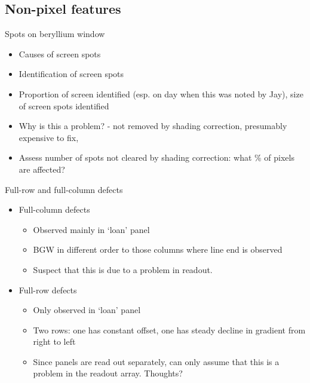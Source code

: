 \documentclass{beamer}
\begin{document}

\subsection{Non-pixel features}

\begin{frame}{Spots on beryllium window}

	\begin{itemize}
	
		\item Causes of screen spots
		
		\item Identification of screen spots
		
		\item Proportion of screen identified (esp. on day when this was noted by Jay), size of screen spots identified
		
		\item Why is this a problem? - not removed by shading correction, presumably expensive to fix, 
		
		\item Assess number of spots not cleared by shading correction: what \% of pixels are affected?
	
	\end{itemize}
	
\end{frame}


\begin{frame}{Full-row and full-column defects}

	\begin{itemize}
		\item Full-column defects
		\begin{itemize}
			\item Observed mainly in `loan' panel
			\item BGW in different order to those columns where line end is observed
			\item Suspect that this is due to a problem in readout.
		\end{itemize}
		\item Full-row defects
		\begin{itemize}
			\item Only observed in `loan' panel
			\item Two rows: one has constant offset, one has steady decline in gradient from right to left
			\item Since panels are read out separately, can only assume that this is a problem in the readout array. Thoughts?
		\end{itemize}
	\end{itemize}
	
\end{frame}
\end{document}
